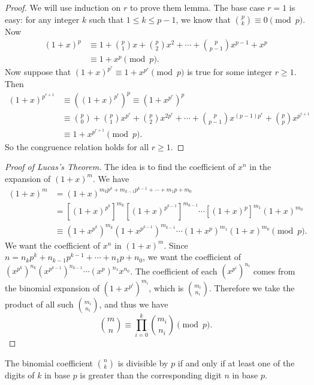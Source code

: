 \documentclass[12pt]{subfile}
\begin{document}
	\begin{proof}
		We will use induction on $r$ to prove them lemma. The base case $r=1$ is easy: for any integer $k$ such that $1 \leq k \leq p-1$, we know that $\binom{p}{k} \equiv 0 \pmod p$. Now
			\begin{align*}
				(1+x)^p&\equiv 1+\binom{p}{1}x+\binom{p}{2}x^2+\cdots+\binom{p}{p-1}x^{p-1}+x^p\\ &\equiv 1+x^p\pmod p.
			\end{align*}
		Now suppose that $(1+x)^{p^r}\equiv 1+x^{p^r}\pmod{p}$ is true for some integer $r \geq 1$. Then
			\begin{align*}
				(1+x)^{p^{r+1}} &\equiv\left((1+x)^{p^r}\right)^p \equiv\left(1+x^{p^r}\right)^p\\ &\equiv\binom{p}{0}+\binom{p}{1}x^{p^r}+\binom{p}{2}x^{2p^r}+\cdots+\binom{p}{p-1}x^{(p-1)p^r}+\binom{p}{p}x^{p^{r+1}}\\ &\equiv 1+x^{p^{r+1}}\pmod{p}.
			\end{align*}
		So the congruence relation holds for all $r \geq 1$.
	\end{proof}
	
	\begin{proof}[Proof of Lucas's Theorem]
		The idea is to find the coefficient of $x^n$ in the expansion of $(1+x)^m$. We have
			\begin{align*}
				(1+x)^m&=(1+x)^{m_kp^k+m_{k-1}p^{k-1}+\cdots+m_1p+m_0}\\ &=[(1+x)^{p^k}]^{m_k}[(1+x)^{p^{k-1}}]^{m_{k-1}}\cdots[(1+x)^p]^{m_1}(1+x)^{m_0}\\ &\equiv(1+x^{p^k})^{m_k}(1+x^{p^{k-1}})^{m_{k-1}}\cdots(1+x^p)^{m_1}(1+x)^{m_0}\pmod{p}.
			\end{align*}
		We want the coefficient of $x^n$ in $(1+x)^m$. Since $n=n_kp^k+n_{k-1}p^{k-1}+\cdots +n_1p+n_0$, we want the coefficient of $(x^{p^{k}})^{n_{k}}(x^{p^{k-1}})^{n_{k-1}}\cdots (x^p)^{n_1}x^{n_0}$.
		The coefficient of each $(x^{p^{i}})^{n_{i}}$ comes from the binomial expansion of $(1+x^{p^i})^{m_i}$, which is $\binom{m_i}{n_i}$. Therefore we take the product of all such $\binom{m_i}{n_i}$, and thus we have
		\begin{equation*}
		\binom{m}{n}\equiv\prod_{i=0}^{k}\binom{m_i}{n_i}\pmod{p}.
		\end{equation*}		
	\end{proof}
	
	\begin{corollary}\label{cor:binomdiv}
		The binomial coefficient $\binom{n}{k}$ is divisible by $p$ if and only if at least one of the digits of $k$ in base $p$ is greater than the corresponding digit $n$ in base $p$.
	\end{corollary}
	
\end{document}
